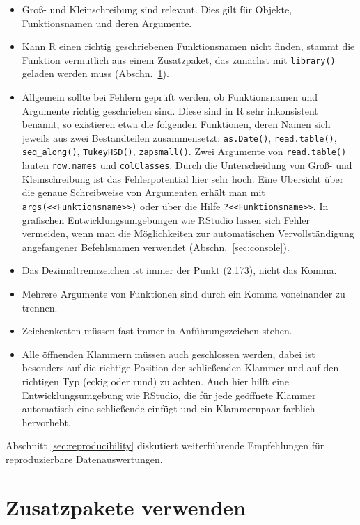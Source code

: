 \begin{itemize}
\item Groß- und Kleinschreibung sind relevant. Dies gilt für Objekte, Funktionsnamen und deren Argumente.
\item Kann R einen richtig geschriebenen Funktionsnamen nicht finden, stammt die Funktion vermutlich aus einem Zusatzpaket, das zunächst mit \lstinline!library()! geladen werden muss (Abschn.\ \ref{sec:packages}).
\item Allgemein sollte bei Fehlern geprüft werden, ob Funktionsnamen und Argumente richtig geschrieben sind. Diese sind in R sehr inkonsistent benannt, so existieren etwa die folgenden Funktionen, deren Namen sich jeweils aus zwei Bestandteilen zusammensetzt: \lstinline!as.Date()!, \lstinline!read.table()!, \lstinline!seq_along()!, \lstinline!TukeyHSD()!, \lstinline!zapsmall()!. Zwei Argumente von \lstinline!read.table()! lauten \lstinline!row.names! und \lstinline!colClasses!. Durch die Unterscheidung von Groß- und Kleinschreibung ist das Fehlerpotential hier sehr hoch. Eine Übersicht über die genaue Schreibweise von Argumenten erhält man mit \lstinline!args(<<Funktionsname>>)! oder über die Hilfe \lstinline!?<<Funktionsname>>!. In grafischen Entwicklungsumgebungen wie RStudio lassen sich Fehler vermeiden, wenn man die Möglichkeiten zur automatischen 
Vervollständigung angefangener Befehlsnamen verwendet (Abschn.\ \ref{sec:console}).
\item Das Dezimaltrennzeichen ist immer der Punkt (2.173), nicht das Komma.
\item Mehrere Argumente von Funktionen sind durch ein Komma voneinander zu trennen.
\item Zeichenketten müssen fast immer in Anführungszeichen stehen.
\item Alle öffnenden Klammern müssen auch geschlossen werden, dabei ist besonders auf die richtige Position der schließenden Klammer und auf den richtigen Typ (eckig oder rund) zu achten. Auch hier hilft eine Entwicklungsumgebung wie RStudio, die für jede geöffnete Klammer automatisch eine schließende einfügt und ein Klammernpaar farblich hervorhebt.
\end{itemize}

Abschnitt \ref{sec:reproducibility} diskutiert weiterführende Empfehlungen für reproduzierbare Datenauswertungen.

\section{Zusatzpakete verwenden}
\label{sec:packages}

